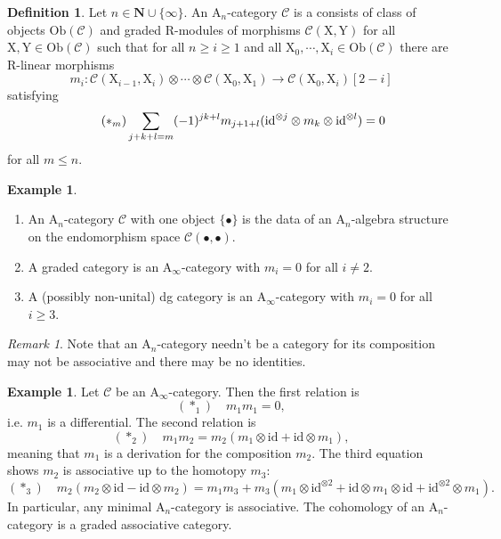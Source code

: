 \documentclass{article}
\theoremstyle{plain}
\theoremstyle{definition}
\newtheorem{definition}[theorem]{Definition}
\newtheorem{example}[theorem]{Example}
\theoremstyle{remark}
\newtheorem{remark}[theorem]{Remark}
\newcommand{\mr}{\mathrm}
\newcommand{\Aa}{\mr{A}_{\infty}}
\newcommand{\Cc}{\mathcal C}
\newcommand{\3}{\vspace{3mm}}
\newcommand{\2}{\vspace{2mm}}
\newcommand{\1}{\vspace{1mm}}
\begin{document}
\begin{definition}
Let $n \in \mathbf{N} \cup \{\infty \}$. An $\mr A_n$-category $\mathcal{C}$ is a consists of class of objects $\mr{Ob}(\mathcal{C})$ and graded $\mr{R}$-modules of morphisms $\mathcal{C}(\mr{X,Y})$ for all $\mr{X,Y}\in \mr{Ob}(\mathcal{C})$ such that for all $n\ge i\ge 1$ and all $\mr{X}_0,\cdots,\mr{X}_i \in \mr{Ob}(\mathcal{C})$ there are $\mr{R}$-linear morphisms $$m_i:\mathcal{C}(\mr{X}_{i-1},\mr{X}_{i})\otimes\cdots\otimes \mathcal{C}(\mr{X}_0,\mr{X}_1)\to \mathcal{C}(\mr{X}_0,\mr{X}_i)[2-i]$$ satisfying \begin{equation}\label{defeq1cat} \tag{$*_{m}$}
 \sum_{j+k+l=m} (-1)^{jk+l}m_{j+1+l}(\mr{id}^{\otimes j}\otimes m_{k}\otimes \mr{id}^{\otimes l})=0
 \end{equation}
 for all $m\le n$.
\end{definition}
\2
\begin{example}
\begin{enumerate}
\item An $\mr{A}_n$-category $\mathcal{C}$ with one object $\{\bullet\}$ is the data of an $\mr{A}_n$-algebra structure on the endomorphism space $\mathcal{C}(\bullet,\bullet)$.
\item A graded category is an $\Aa$-category with $m_i=0$ for all $i\not=2$.
\item A (possibly non-unital) dg category is an $\Aa$-category with $m_i=0$ for all $i\ge 3$.
\end{enumerate}
\end{example}
\2
\begin{remark}
Note that an $\mr{A}_n$-category needn't be a category for its composition may not be associative and there may be no identities.
\end{remark}
\2
\begin{example}
 Let $\Cc$ be an $\Aa$-category. Then the first relation is $$(*_1) \quad m_1m_1 =0,$$ i.e. $m_1$ is a differential. The second relation is $$(*_2) \quad m_1m_2 = m_2(m_1\otimes \mr{id} + \mr{id} \otimes m_1),$$ meaning that $m_1$ is a derivation for the composition $m_2$. The third equation shows $m_2$ is associative up to the homotopy $m_3$: $$(*_3) \quad m_2(m_2\otimes \mr{id} - \mr{id}\otimes m_2) = m_1m_3+m_3(m_1\otimes \mr{id}^{\otimes 2} + \mr{id}\otimes m_1 \otimes \mr{id} + \mr{id}^{\otimes 2}\otimes m_1).$$ In particular, any minimal $\mr{A}_n$-category is associative. The cohomology of an $\mr{A}_n$-category is a graded associative category.
\end{example}
\end{document}
